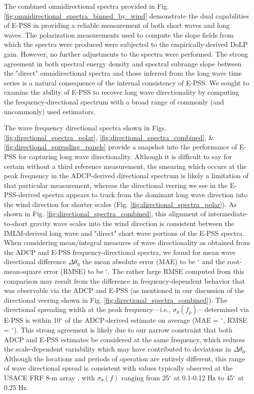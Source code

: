 \documentclass[letterpaper,draftcls,onecolumn]{IEEEtran}
\begin{document}
The combined omnidirectional spectra provided in Fig. \ref{fig:omnidirectional_spectra_binned_by_wind} demonstrate the dual capabilities of E-PSS in providing a reliable measurement of both short waves and long waves. The polarization measurements used to compute the slope fields from which the spectra were produced were subjected to the empirically-derived DoLP gain. However, no further adjustments to the spectra were performed. The strong agreement in both spectral energy density and spectral subrange slope between the "direct" omnidirectional spectra and those inferred from the long wave time series is a natural consequence of the internal consistency of E-PSS. We sought to examine the ability of E-PSS to recover long wave directionality by computing the frequency-directional spectrum with a broad range of commonly (and uncommonly) used estimators.

The wave frequency directional spectra shown in Figs. \ref{fig:directional_spectra_polar}, \ref{fig:directional_spectra_combined}, \& \ref{fig:directional_spreading_panels} provide a snapshot into the performance of E-PSS for capturing long wave directionality. Although it is difficult to say for certain without a third reference measurement, the smearing which occurs at the peak frequency in the ADCP-derived directional spectrum is likely a limitation of that particular measurement, whereas the directional veering we see in the E-PSS-derived spectra appears to track from the dominant long wave direction into the wind direction for shorter scales (Fig. \ref{fig:directional_spectra_polar}). As shown in Fig. \ref{fig:directional_spectra_combined}, this alignment of intermediate-to-short gravity wave scales into the wind direction is consistent between the IMLM-derived long wave and "direct" short wave portions of the E-PSS spectra. When considering mean/integral measures of wave directionality as obtained from the ADCP and E-PSS frequency-directional spectra, we found for mean wave directional difference $\Delta\theta_0$ the mean absolute error (MAE) to be \MwdMAE$^{\circ}$ and the root-mean-square error (RMSE) to be \MwdRMSE$^{\circ}$. The rather large RMSE computed from this comparison may result from the difference in frequency-dependent behavior that was observable via the ADCP and E-PSS (as mentioned in our discussion of the directional veering shown in Fig. \ref{fig:directional_spectra_combined}). The directional spreading width at the peak frequency---i.e., $\sigma_\theta(f_p)$---determined via E-PSS is within 10$^{\circ}$ of the ADCP-derived estimate on average (MAE = \SpreadMAE$^{\circ}$, RMSE = \SpreadRMSE$^{\circ}$). This strong agreement is likely due to our narrow constraint that both ADCP and E-PSS estimates be considered at the same frequency, which reduces the scale-dependent variability which may have contributed to deviations in $\Delta\theta_0$. Although the locations and periods of operation are entirely different, this range of wave directional spread is consistent with values typically observed at the USACE FRF 8-m array \cite{collins_performance_2024}, with $\sigma_\theta(f)$ ranging from 25$^{\circ}$ at 0.1-0.12 Hz to 45$^{\circ}$ at 0.25 Hz.
\end{document}
